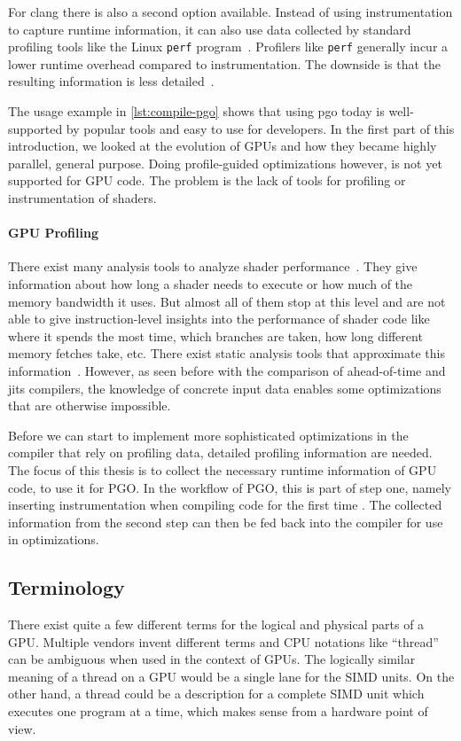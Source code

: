 For clang there is also a second option available. Instead of using instrumentation to capture runtime information, it can also use data collected by standard profiling tools like the Linux \texttt{perf} program~\cite{LinuxPerf}. Profilers like \texttt{perf} generally incur a lower runtime overhead compared to instrumentation. The downside is that the resulting information is less detailed~\cite{ClangManual}.

The usage example in \cref{lst:compile-pgo} shows that using \gls{pgo} today is well-supported by popular tools and easy to use for developers.
In the first part of this introduction, we looked at the evolution of GPUs and how they became highly parallel, general purpose. Doing profile-guided optimizations however, is not yet supported for GPU code. The problem is the lack of tools for profiling or instrumentation of shaders.

\paragraph{GPU Profiling} There exist many analysis tools to analyze shader performance~\cite{RenderDoc, NvidiaShaderPerf}. They give information about how long a shader needs to execute or how much of the memory bandwidth it uses. But almost all of them stop at this level and are not able to give instruction-level insights into the performance of shader code like where it spends the most time, which branches are taken, how long different memory fetches take, etc.
There exist static analysis tools that approximate this information~\cite{AMDShaderAnalyzer}. However, as seen before with the comparison of ahead-of-time and \glspl{jit} compilers, the knowledge of concrete input data enables some optimizations that are otherwise impossible.

Before we can start to implement more sophisticated optimizations in the compiler that rely on profiling data, detailed profiling information are needed.
The focus of this thesis is to collect the necessary runtime information of GPU code, to use it for PGO. In the workflow of PGO, this is part of step one, namely inserting instrumentation when compiling code for the first time%
. The collected information from the second step can then be fed back into the compiler for use in optimizations.

\subsection{Terminology}
\label{sub:terminology}
There exist quite a few different terms for the logical and physical parts of a GPU. Multiple vendors invent different terms and CPU notations like \enquote{thread} can be ambiguous when used in the context of GPUs. The logically similar meaning of a thread on a GPU would be a single lane for the SIMD units. On the other hand, a thread could be a description for a complete SIMD unit which executes one program at a time, which makes sense from a hardware point of view.

